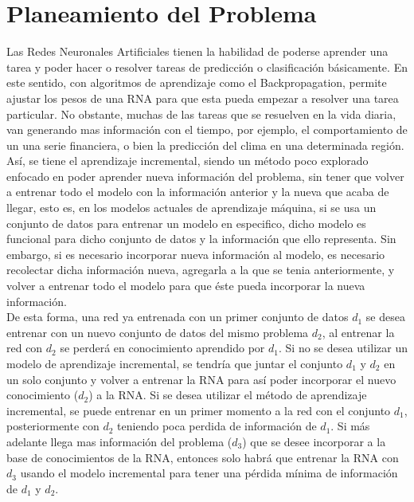\section{Planeamiento del Problema}
	
	
    Las Redes Neuronales Artificiales tienen la habilidad de poderse aprender una tarea 
    y poder hacer o resolver tareas de predicción o clasificación básicamente. En este 
    sentido, con algoritmos de aprendizaje como el Backpropagation, permite ajustar los 
    pesos de una RNA para que esta pueda empezar a resolver una tarea particular.  No 
    obstante, muchas de las tareas que se resuelven en la vida diaria, van generando mas 
    información con el tiempo, por ejemplo, el comportamiento de un una serie financiera, 
    o bien la predicción del clima en una determinada región. Así,  se tiene el aprendizaje 
    incremental, siendo un método poco explorado  enfocado en poder aprender nueva información del 
    problema, sin tener que volver a entrenar todo el modelo con la información anterior y la 
    nueva que acaba de llegar, esto es, en los modelos actuales de aprendizaje máquina, si se usa 
    un conjunto de datos para entrenar un modelo en especifico, dicho modelo es funcional para 
    dicho conjunto de datos y la información que ello representa. Sin embargo, si es necesario 
    incorporar nueva información al modelo, es necesario recolectar dicha información nueva, 
    agregarla a la que se tenia anteriormente, y volver a entrenar todo el modelo para que \'este 
    pueda incorporar la nueva información.\\

    De esta forma, una red ya entrenada con un primer conjunto de datos $d_{1}$ se desea entrenar 
    con un nuevo conjunto de datos del mismo problema $d_{2}$, al entrenar la red con $d_{2}$ se 
    perderá en conocimiento aprendido por $d_{1}$.  Si no se desea utilizar un modelo de aprendizaje 
    incremental, se tendría que juntar el conjunto $d_{1}$ y $d_{2}$ en un solo conjunto y volver a 
    entrenar la RNA para así poder incorporar el nuevo conocimiento ($d_{2}$) a la RNA. Si se desea 
    utilizar el método de aprendizaje incremental, se puede entrenar en un primer momento a la red 
    con el conjunto $d_{1}$, posteriormente con $d_{2}$ teniendo poca perdida de información de $d_{1}$. 
    Si más adelante llega mas información del problema ($d_{3}$) que se desee incorporar a la base 
    de conocimientos de la RNA, entonces solo habrá que entrenar la RNA con $d_{3}$ usando el modelo 
    incremental para tener una p\'erdida mínima de información de $d_{1}$ y $d_{2}$. \\

